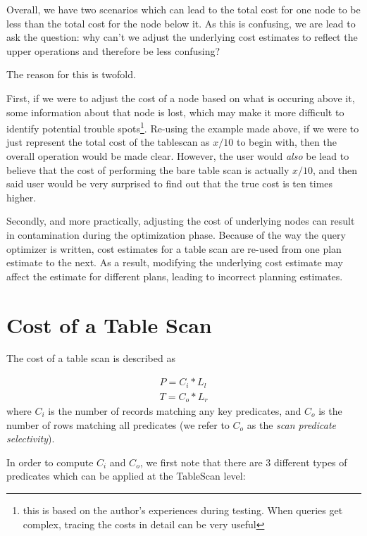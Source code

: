 \documentclass[10pt]{amsart}
\begin{document}
Overall, we have two scenarios which can lead to the total cost for one node to be less than the total cost for the node below it. As this is confusing, we are lead to ask the question: why can't we adjust the underlying cost estimates to reflect the upper operations and therefore be less confusing?

The reason for this is twofold. 

First, if we were to adjust the cost of a node based on what is occuring above it, some information about that node is lost, which may make it more difficult to identify potential trouble spots\footnote{this is based on the author's experiences during testing. When queries get complex, tracing the costs in detail can be very useful}. Re-using the example made above, if we were to just represent the total cost of the tablescan as $x/10$ to begin with, then the overall operation would be made clear. However, the user would \emph{also} be lead to believe that the cost of performing the bare table scan is actually $x/10$, and then said user would be very surprised to find out that the true cost is ten times higher.

Secondly, and more practically, adjusting the cost of underlying nodes can result in contamination during the optimization phase. Because of the way the query optimizer is written, cost estimates for a table scan are re-used from one plan estimate to the next. As a result, modifying the underlying cost estimate may affect the estimate for different plans, leading to incorrect planning estimates.

\section{Cost of a Table Scan}
The cost of a table scan is described as 

\begin{equation}
	\begin{aligned}
				P = C_i*L_l   \\
				T = C_o*L_r
	\end{aligned}
\end{equation}
where $C_i$ is the number of records matching any key predicates, and $C_o$ is the number of rows matching all predicates (we refer to $C_o$ as the \emph{scan predicate selectivity}).

 In order to compute $C_i$ and $C_o$, we first note that there are 3 different types of predicates which can be applied at the TableScan level:
\end{document}
